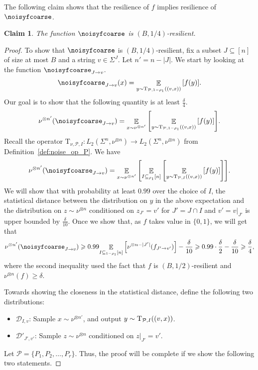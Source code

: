 \documentclass[11pt]{article}
\newtheorem{claim}[thm]{Claim}
\newcommand\Expect[2]{{\mathop{\mathbb{E}}_{#1}\left[ {#2} \right]}}
\renewcommand\geq{\geqslant}
\begin{document}
The following claim shows that the resilience of $f$ implies resilience of $\noisyfcoarse$.
\begin{claim}
\label{claim:f_to_noisyf_resilience}
The function $\noisyfcoarse$ is $(B, 1/4)$-resilient.
\end{claim}
\begin{proof}
To show that $\noisyfcoarse$ is $(B, 1/4)$-resilient, fix a subset $J \subseteq [n]$ of size at most $B$ and a string $v\in \Sigma^{J}$. Let $n' = n-|J|$.
We start by looking at the function $\noisyfcoarse_{J\rightarrow v}$.
\[
\noisyfcoarse_{J\rightarrow v} (x) = \Expect{y\sim {\rm T}_{\mathcal{P}, 1-\rho_1} ((v, x))}{f(y)}.
\]
Our goal is to show that the following quantity is at least $ \frac{\delta}{4}$.
\[
\nu^{\otimes n'}(\noisyfcoarse_{J\rightarrow v} ) = \Expect{x\sim \nu^{\otimes n'}}{\Expect{y\sim {\rm T}_{\mathcal{P}, 1-\rho_1} ((v, x))}{f(y)}}.
\]
Recall the operator $\mathrm{T}_{\nu, \mathcal{P}, I} \colon L_2(\Sigma^n,\nu^{\otimes n})\to L_2(\Sigma^n,\nu^{\otimes n})$ from Definition~\ref{def:noise_op_P}. 
We have
\[
\nu^{\otimes n'}(\noisyfcoarse_{J\rightarrow v} ) = \Expect{x\sim \nu^{\otimes n'}}{\Expect{I\subseteq_{\rho_1}[n]}{\Expect{y\sim {\rm T}_{\mathcal{P},I} ((v, x))}{f(y)}}} .
\]
We will show that with probability at least $0.99$ over the choice of $I$, the statistical distance between the distribution on $y$ in the above expectation and the distribution on $z\sim \nu^{\otimes n}$ conditioned on $z_{J'} =  v'$ for $J' = J\cap I$ and $v' = v|_{J'}$  is upper bounded by $\frac{\delta}{10}$. Once we show that, as $f$ takes value in $\{0, 1\}$, we will get that
\[
\nu^{\otimes n'}(\noisyfcoarse_{J\rightarrow v} )  \geq 0.99\Expect{I\subseteq_{1-\rho_1} [n]}{\nu^{\otimes n-|J'|}(f_{J'\rightarrow v'})} - \frac{\delta}{10}\geq 0.99\cdot \frac{\delta}{2} - \frac{\delta}{10} \geq \frac{\delta}{4},
\]
where the second inequality used the fact that $f$ is $(B, 1/2)$-resilient and $\nu^{\otimes n}(f) \geq \delta$.

Towards showing the closeness in the statistical distance, define the following two distributions:
\begin{itemize}
    \item $\mathcal{D}_{I,v}$: Sample $x\sim \nu^{\otimes n'}$, and output $y\sim {\rm T}_{\mathcal{P},I} ((v, x))$. 
    \item $\mathcal{D}'_{J', v'}$: Sample $z\sim \nu^{\otimes n}$ conditioned on $z|_{J'} = v'$. 
\end{itemize}
Let $\mathcal{P} = \{P_1, P_2, \ldots, P_r\}$. 
Thus, the proof will be complete if we show the following two statements. 


\end{proof}
\end{document}
